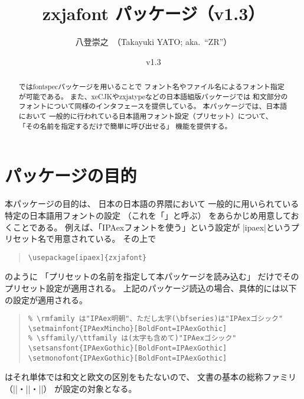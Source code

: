 \documentclass[xelatex,ja=standard,jafont=haranoaji,
  a4paper]{bxjsarticle}
\newcommand*{\EG}{\eghostguarded}
\newcommand{\PkgVersion}{1.3}
\newcommand{\PkgDate}{2022/03/21}
\newcommand{\Pkg}[1]{\textsf{#1}}
\newcommand{\JEmph}{\textgt}
\begin{document}
\title{\Pkg{zxjafont} パッケージ（v\PkgVersion）}
\author{八登崇之\ （Takayuki YATO; aka.~``ZR''）}
\date{v\PkgVersion\quad[\PkgDate]}
\maketitle

\begin{abstract}
\EG{\XeLaTeX}では\Pkg{fontspec}パッケージを用いることで
フォント名やファイル名によるフォント指定が可能である。
また、\Pkg{xeCJK}や\Pkg{zxjatype}などの日本語組版パッケージでは
和文部分のフォントについて同様のインタフェースを提供している。
本パッケージでは、日本語\EG{\LaTeX}において
一般的に行われている日本語用フォント設定（プリセット）について、
「その名前を指定するだけで簡単に呼び出せる」
機能を提供する。
\end{abstract}

\tableofcontents

\section{パッケージの目的}
\label{sec:Overview}

本パッケージの目的は、
日本の日本語\EG{\LaTeX}の界隈において
一般的に用いられている特定の日本語用フォントの設定
（これを「\JEmph{プリセット}」と呼ぶ）
をあらかじめ用意しておくことである。
例えば、「IPAexフォントを使う」という設定が%
|ipaex|というプリセット名で用意されている。
その上で
\begin{quote}\small\begin{verbatim}
\usepackage[ipaex]{zxjafont}
\end{verbatim}\end{quote}
のように
「プリセットの名前を指定して本パッケージを読み込む」
だけでそのプリセット設定が適用される。
上記のパッケージ読込の場合、具体的には以下の設定が適用される。
\begin{quote}\small\begin{verbatim}
% \rmfamily は"IPAex明朝"、ただし太字(\bfseries)は"IPAexゴシック"
\setmainfont{IPAexMincho}[BoldFont=IPAexGothic]
% \sffamily/\ttfamily は(太字も含めて)"IPAexゴシック"
\setsansfont{IPAexGothic}[BoldFont=IPAexGothic]
\setmonofont{IPAexGothic}[BoldFont=IPAexGothic]
\end{verbatim}\end{quote}
\EG{\XeLaTeX}はそれ単体では和文と欧文の区別をもたないので、
文書の基本の総称ファミリ
（|\rmfamily|・|\sffamily|・|\ttfamily|）
が設定の対象となる。
\end{document}

